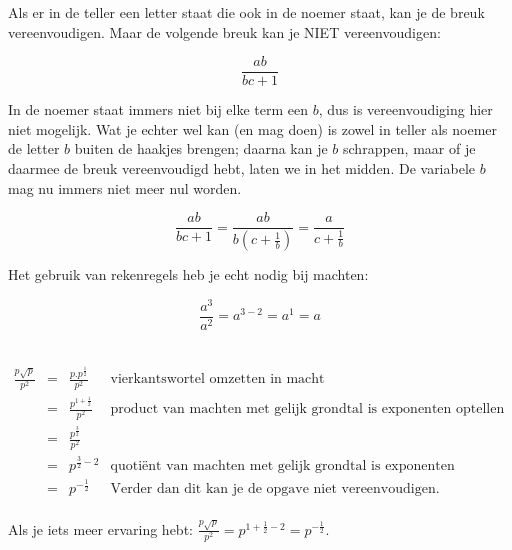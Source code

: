 	Als er in de teller een letter staat die ook in de noemer
	staat, kan je de breuk vereenvoudigen. Maar de volgende breuk kan
	je NIET vereenvoudigen:
	
	\begin{equation*}
	\frac{ab}{bc+1}
	\end{equation*}
	
	In de noemer staat immers niet bij elke term een $b$, dus
	is vereenvoudiging hier niet mogelijk. Wat je echter wel kan (en mag
	doen) is zowel in teller als noemer de letter $b$ buiten de haakjes
	brengen; daarna kan je $b$ schrappen, maar of je daarmee de breuk
	vereenvoudigd hebt, laten we in het midden. De variabele $b$ mag
	nu immers niet meer nul worden.
	
	\begin{equation*}
	\frac{ab}{bc+1}={\displaystyle \frac{ab}{b(c+\frac{1}{b})}=\frac{a}{c+\frac{1}{b}}}
	\end{equation*}
	
	Het gebruik van rekenregels heb je echt nodig bij machten:
	
	\begin{equation*}
	\frac{a^{3}}{a^{2}}=a^{3-2}=a^{1}=a
	\end{equation*}
	
	\begin{voorbeeld}
	\ \\
	\begin{math}
	\begin{array}{ccc|r}
	{\displaystyle \frac{p\sqrt{p}}{p^{2}}} & = & {\displaystyle \frac{p.p^{\frac{1}{2}}}{p^{2}}} &   \text{vierkantswortel omzetten in macht}\\
	& = & {\displaystyle \frac{p^{1+\frac{1}{2}}}{p^{2}}} &  \text{product van machten met gelijk grondtal is exponenten optellen}\\
	& = & {\displaystyle \frac{p^{\frac{3}{2}}}{p^{2}}} &  \\
	& = & {\displaystyle p^{\frac{3}{2}-2}} &  \text{quoti\"ent van machten met gelijk grondtal is exponenten aftrekken}\\
	& = & {\displaystyle p^{-\frac{1}{2}}} &  \text{Verder dan dit kan je de opgave niet vereenvoudigen.}\\
	\end{array}
	\end{math}
	
	\end{voorbeeld}
	
	Als je iets meer ervaring hebt: $\frac{p\sqrt{p}}{p^{2}}=p^{1+\frac{1}{2}-2}={\displaystyle p^{-\frac{1}{2}}}$.


